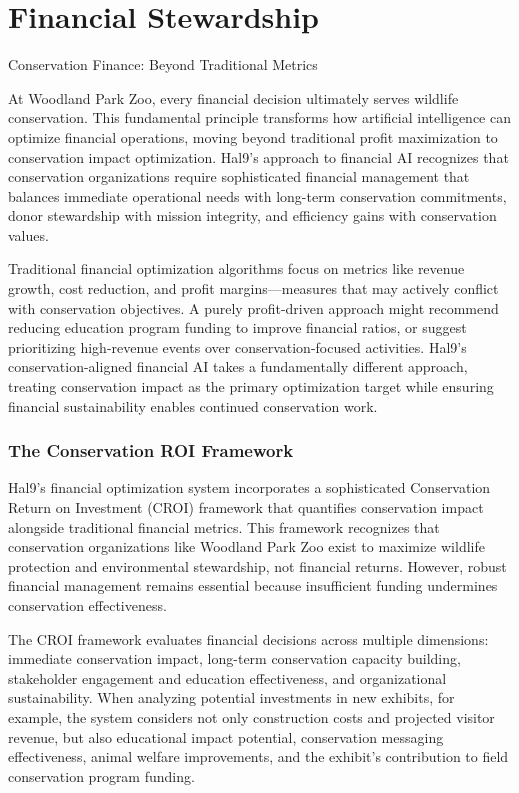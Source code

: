 \documentclass[
  Letterpaper,
]{scrbook}
\begin{document}

\chapter{Financial Stewardship}\label{financial-stewardship}

Conservation Finance: Beyond Traditional Metrics

\hfill\break

At Woodland Park Zoo, every financial decision ultimately serves
wildlife conservation. This fundamental principle transforms how
artificial intelligence can optimize financial operations, moving beyond
traditional profit maximization to conservation impact optimization.
Hal9's approach to financial AI recognizes that conservation
organizations require sophisticated financial management that balances
immediate operational needs with long-term conservation commitments,
donor stewardship with mission integrity, and efficiency gains with
conservation values.

Traditional financial optimization algorithms focus on metrics like
revenue growth, cost reduction, and profit margins---measures that may
actively conflict with conservation objectives. A purely profit-driven
approach might recommend reducing education program funding to improve
financial ratios, or suggest prioritizing high-revenue events over
conservation-focused activities. Hal9's conservation-aligned financial
AI takes a fundamentally different approach, treating conservation
impact as the primary optimization target while ensuring financial
sustainability enables continued conservation work.

\subsection{The Conservation ROI
Framework}\label{the-conservation-roi-framework}

Hal9's financial optimization system incorporates a sophisticated
Conservation Return on Investment (CROI) framework that quantifies
conservation impact alongside traditional financial metrics. This
framework recognizes that conservation organizations like Woodland Park
Zoo exist to maximize wildlife protection and environmental stewardship,
not financial returns. However, robust financial management remains
essential because insufficient funding undermines conservation
effectiveness.

The CROI framework evaluates financial decisions across multiple
dimensions: immediate conservation impact, long-term conservation
capacity building, stakeholder engagement and education effectiveness,
and organizational sustainability. When analyzing potential investments
in new exhibits, for example, the system considers not only construction
costs and projected visitor revenue, but also educational impact
potential, conservation messaging effectiveness, animal welfare
improvements, and the exhibit's contribution to field conservation
program funding.
\end{document}
